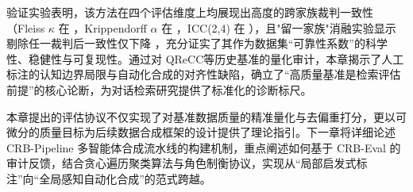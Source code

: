 验证实验表明，该方法在四个评估维度上均展现出高度的跨家族裁判一致性（Fleiss $\kappa$ 在 ，Krippendorff $\alpha$ 在 ，ICC(2,4) 在 ），且"留一家族"消融实验显示剔除任一裁判后一致性仅下降 ，充分证实了其作为数据集“可靠性系数”的科学性、稳健性与可复现性。通过对 QReCC等历史基准的量化审计，本章揭示了人工标注的认知边界局限与自动化合成的对齐性缺陷，确立了“高质量基准是检索评估前提”的核心论断，为对话检索研究提供了标准化的诊断标尺。



本章提出的评估协议不仅实现了对基准数据质量的精准量化与去偏重打分，更以可微分的质量目标为后续数据合成框架的设计提供了理论指引。下一章将详细论述 CRB-Pipeline 多智能体合成流水线的构建机制，重点阐述如何基于 CRB-Eval 的审计反馈，结合贪心遍历聚类算法与角色制衡协议，实现从“局部启发式标注”向“全局感知自动化合成”的范式跨越。